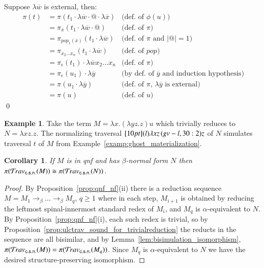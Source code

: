 \documentclass{elsarticle}
\theoremstyle{plain}
\newtheorem{corollary}[theorem]{Corollary}
\theoremstyle{definition}
\newtheorem{example}{Example}[section]
\newcommand{\travsetscn}{\travset_{\sf c.s.n.}} %
\def\coresymbol{\pi} %
\newcommand{\core}[1]{\coresymbol(#1)} %
\begin{document}
    Suppose $\lambda\overline{w}$ is external, then:
    \begin{align*}
        \coresymbol(t)
        &=  \coresymbol(t_1 \cdot \lambda\overline{w} \cdot @ \cdot \lambda\overline{x})
            & \mbox{(def.~of $\phi(u)$)}
        \\
        &=  \coresymbol_{\overline{x}}(t_1 \cdot
        \lambda\overline{w} \cdot @)
            & \mbox{(def.~of $\coresymbol$)}
        \\
        &=  \coresymbol_{pop_1(\overline{x})}(t_1 \cdot \lambda\overline{w})
            & \mbox{(def.~of $\coresymbol$ and $|@|=1$)}
        \\
        &=  \coresymbol_{x_2\ldots x_n}(t_1 \cdot \lambda\overline{w})
        & \mbox{(def.~of $pop$)}
        \\
        &=  \coresymbol_{\epsilon}(t_1) \cdot \lambda\overline{w} x_2\ldots x_n
            & \mbox{(def.~of $\coresymbol$)}
        \\
            &= \coresymbol_{\epsilon}(u_1) \cdot \lambda\overline{y}
            & \mbox{(by def.~of $\overline{y}$ and induction hypothesis)}
        \\
        &= \coresymbol(u_1 \cdot \lambda\overline{y})
            & \mbox{(def.~of $\coresymbol$, $\lambda\overline{y}$ is external)}
        \\
        &= \coresymbol(u)
            & \mbox{(def.~of $u$)}
    \end{align*}
\fi
\qed

\begin{example}
    Take the term $M = \lambda x. (\lambda y z.z) u$ which trivially reduces to $N = \lambda x z . z$. The normalizing traversal $\Pstr[10pt]{ (l){\lambda x z} \, (gv-l,30:2){z} }$ of $N$
    simulates traversal $t$ of $M$ from Example~\ref{examp:ghost_materialization}.
\end{example}


\begin{corollary}
\label{cor:qnf_and_nf_traveset_invariant}
If $M$ is in \emph{qnf} and has $\beta$-normal form $N$ then $\coresymbol(\travsetscn(M)) \cong \coresymbol(\travsetscn(N))$.
\end{corollary}
\begin{proof}
By Proposition~\ref{prop:qnf_nf}(ii) %
 there is a reduction sequence $M = M_1 \rightarrow_\beta \ldots \rightarrow_\beta M_q$, $q\geq1$  where in each step, $M_{i+1}$ is obtained by reducing the leftmost spinal-innermost standard redex of $M_i$,
and $M_q$ is $\alpha$-equivalent to $N$.
By Proposition~\ref{prop:qnf_nf}(i), each such redex is trivial, so by Proposition~\ref{prop:ulctrav_sound_for_trivialreduction}
the reducts in the sequence are all bisimilar, and by Lemma~\ref{lem:bisimulation_isomorphism}, $\core{\travsetscn(M)} = \core{\travsetscn(M_q)}$. Since $M_q$ is $\alpha$-equivalent to $N$ we have the desired structure-preserving isomorphism.
\end{proof}
\end{document}

